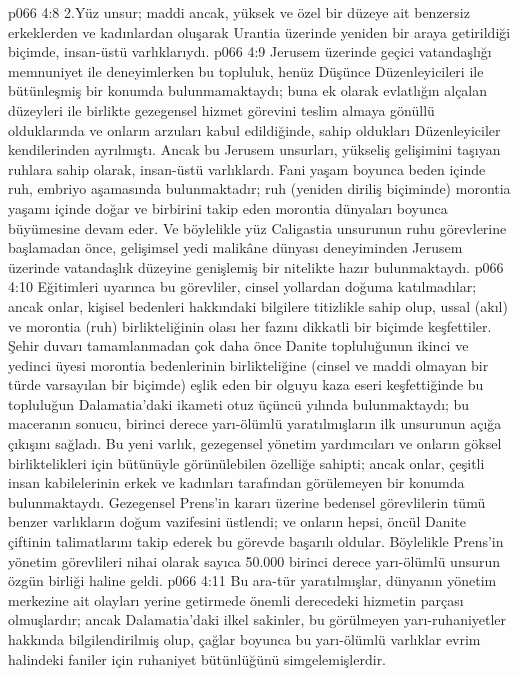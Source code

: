 \vs p066 4:8 2.\bibnobreakspace Yüz unsur; maddi ancak, yüksek ve özel bir düzeye ait benzersiz erkeklerden ve kadınlardan oluşarak Urantia üzerinde yeniden bir araya getirildiği biçimde, insan\hyp{}üstü varlıklarıydı.
\vs p066 4:9 Jerusem üzerinde geçici vatandaşlığı memnuniyet ile deneyimlerken bu topluluk, henüz Düşünce Düzenleyicileri ile bütünleşmiş bir konumda bulunmamaktaydı; buna ek olarak evlatlığın alçalan düzeyleri ile birlikte gezegensel hizmet görevini teslim almaya gönüllü olduklarında ve onların arzuları kabul edildiğinde, sahip oldukları Düzenleyiciler kendilerinden ayrılmıştı. Ancak bu Jerusem unsurları, yükseliş gelişimini taşıyan ruhlara sahip olarak, insan\hyp{}üstü varlıklardı. Fani yaşam boyunca beden içinde ruh, embriyo aşamasında bulunmaktadır; ruh (yeniden diriliş biçiminde) morontia yaşamı içinde doğar ve birbirini takip eden morontia dünyaları boyunca büyümesine devam eder. Ve böylelikle yüz Caligastia unsurunun ruhu görevlerine başlamadan önce, gelişimsel yedi malikâne dünyası deneyiminden Jerusem üzerinde vatandaşlık düzeyine genişlemiş bir nitelikte hazır bulunmaktaydı.
\vs p066 4:10 Eğitimleri uyarınca bu görevliler, cinsel yollardan doğuma katılmadılar; ancak onlar, kişisel bedenleri hakkındaki bilgilere titizlikle sahip olup, ussal (akıl) ve morontia (ruh) birlikteliğinin olası her fazını dikkatli bir biçimde keşfettiler. Şehir duvarı tamamlanmadan çok daha önce Danite topluluğunun ikinci ve yedinci üyesi morontia bedenlerinin birlikteliğine (cinsel ve maddi olmayan bir türde varsayılan bir biçimde) eşlik eden bir olguyu kaza eseri keşfettiğinde bu topluluğun Dalamatia’daki ikameti otuz üçüncü yılında bulunmaktaydı; bu maceranın sonucu, birinci derece yarı\hyp{}ölümlü yaratılmışların ilk unsurunun açığa çıkışını sağladı. Bu yeni varlık, gezegensel yönetim yardımcıları ve onların göksel birliktelikleri için bütünüyle görünülebilen özelliğe sahipti; ancak onlar, çeşitli insan kabilelerinin erkek ve kadınları tarafından görülemeyen bir konumda bulunmaktaydı. Gezegensel Prens’in kararı üzerine bedensel görevlilerin tümü benzer varlıkların doğum vazifesini üstlendi; ve onların hepsi, öncül Danite çiftinin talimatlarını takip ederek bu görevde başarılı oldular. Böylelikle Prens’in yönetim görevlileri nihai olarak sayıca 50.000 birinci derece yarı\hyp{}ölümlü unsurun özgün birliği haline geldi.
\vs p066 4:11 Bu ara\hyp{}tür yaratılmışlar, dünyanın yönetim merkezine ait olayları yerine getirmede önemli derecedeki hizmetin parçası olmuşlardır; ancak Dalamatia’daki ilkel sakinler, bu görülmeyen yarı\hyp{}ruhaniyetler hakkında bilgilendirilmiş olup, çağlar boyunca bu yarı\hyp{}ölümlü varlıklar evrim halindeki faniler için ruhaniyet bütünlüğünü simgelemişlerdir.
